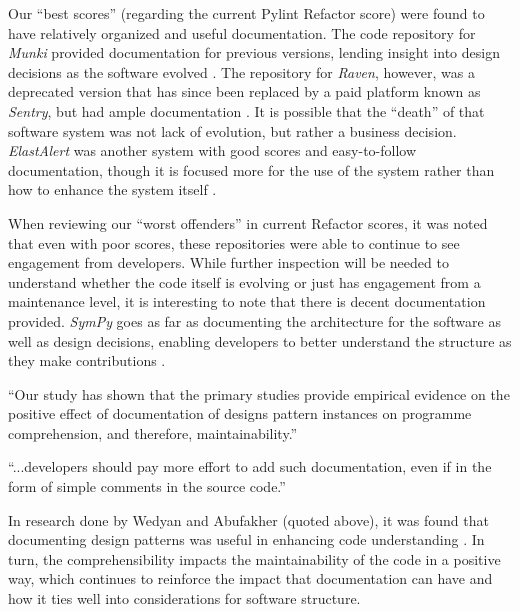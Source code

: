 \documentclass[12pt,conference]{IEEEtran}
\begin{document}
Our ``best scores'' (regarding the current Pylint Refactor score) were found to have relatively organized and useful documentation. The code repository for \emph{Munki} provided documentation for previous versions, lending insight into design decisions as the software evolved \cite{data:munki}. The repository for \emph{Raven}, however, was a deprecated version that has since been replaced by a paid platform known as \emph{Sentry}, but had ample documentation \cite{data:raven-python}. It is possible that the ``death'' of that software system was not lack of evolution, but rather a business decision. \emph{ElastAlert} was another system with good scores and easy-to-follow documentation, though it is focused more for the use of the system rather than how to enhance the system itself \cite{data:elastalert}.

When reviewing our ``worst offenders'' in current Refactor scores, it was noted that even with poor scores, these repositories were able to continue to see engagement from developers. While further inspection will be needed to understand whether the code itself is evolving or just has engagement from a maintenance level, it is interesting to note that there is decent documentation provided. \emph{SymPy} goes as far as documenting the architecture for the software as well as design decisions, enabling developers to better understand the structure as they make contributions \cite{data:sympy-docs}.

\vspace{0.25cm}

\begin{displayquote}
``Our study has shown that the primary studies provide empirical evidence on the positive effect of documentation of designs pattern instances on programme comprehension, and therefore, maintainability.''
\end{displayquote}

\begin{displayquote}
``...developers should pay more effort to add such documentation, even if in the form of simple comments in the source code.''
\end{displayquote}

\vspace{0.25cm}

In research done by Wedyan and Abufakher (quoted above), it was found that documenting design patterns was useful in enhancing code understanding \cite{wedyan:2020}. In turn, the comprehensibility impacts the maintainability of the code in a positive way, which continues to reinforce the impact that documentation can have and how it ties well into considerations for software structure.
\end{document}
